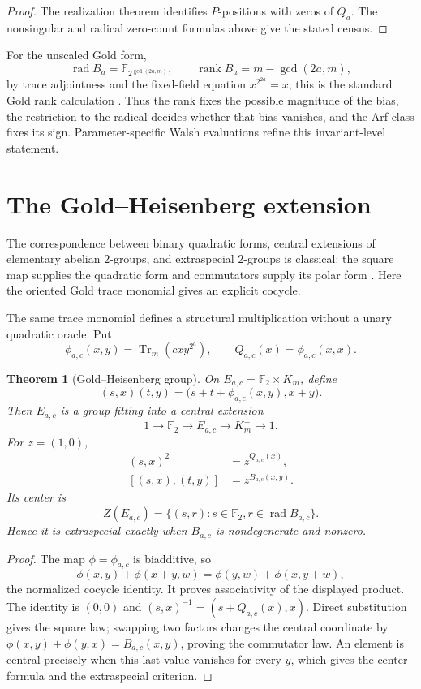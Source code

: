 \documentclass[11pt]{article}
\newtheorem{theorem}{Theorem}[section]
\theoremstyle{definition}
\theoremstyle{remark}
\newcommand{\F}{\mathbb{F}}
\newcommand{\Tr}{\operatorname{Tr}}
\newcommand{\rad}{\operatorname{rad}}
\newcommand{\rank}{\operatorname{rank}}
\begin{document}
\begin{proof}
The realization theorem identifies $P$-positions with zeros of $Q_a$.
The nonsingular and radical zero-count formulas above give the stated
census.
\end{proof}

For the unscaled Gold form,
\[
 \rad B_a=\F_{2^{\gcd(2a,m)}},
 \qquad \rank B_a=m-\gcd(2a,m),
\]
by trace adjointness and the fixed-field equation
$x^{2^{2a}}=x$; this is the standard Gold rank calculation
\cite{coulter1999,hellesethkumar1998}.  Thus the rank fixes the possible
magnitude of the bias, the restriction to the radical decides whether that
bias vanishes, and the Arf class fixes its sign.  Parameter-specific Walsh
evaluations refine this invariant-level statement.

\section{The Gold--Heisenberg extension}\label{sec:heisenberg}

The correspondence between binary quadratic forms, central extensions of
elementary abelian $2$-groups, and extraspecial $2$-groups is classical: the
square map supplies the quadratic form and commutators supply its polar form
\cite[Sections~4--5]{quillen1971}.  Here the oriented Gold trace monomial
gives an explicit cocycle.

The same trace monomial defines a structural multiplication without a unary
quadratic oracle.  Put
\[
 \phi_{a,c}(x,y)=\Tr_m(cxy^{2^a}),
 \qquad Q_{a,c}(x)=\phi_{a,c}(x,x).
\]

\begin{theorem}[Gold--Heisenberg group]\label{thm:heisenberg}
On $E_{a,c}=\F_2\times K_m$, define
\[
 (s,x)(t,y)=\bigl(s+t+\phi_{a,c}(x,y),x+y\bigr).
\]
Then $E_{a,c}$ is a group fitting into a central extension
\[
 1\longrightarrow\F_2\longrightarrow E_{a,c}
 \longrightarrow K_m^+\longrightarrow1.
\]
For $z=(1,0)$,
\begin{align*}
 (s,x)^2&=z^{Q_{a,c}(x)},\\
 [(s,x),(t,y)]&=z^{B_{a,c}(x,y)}.
\end{align*}
Its center is
\[
 Z(E_{a,c})=\{(s,r):s\in\F_2, r\in\rad B_{a,c}\}.
\]
Hence it is extraspecial exactly when $B_{a,c}$ is nondegenerate and
nonzero.
\end{theorem}

\begin{proof}
The map $\phi=\phi_{a,c}$ is biadditive, so
\[
 \phi(x,y)+\phi(x+y,w)=\phi(y,w)+\phi(x,y+w),
\]
the normalized cocycle identity.  It proves associativity of the displayed
product.  The identity is $(0,0)$ and
$(s,x)^{-1}=(s+Q_{a,c}(x),x)$.  Direct substitution gives
the square law; swapping two factors changes the central coordinate by
$\phi(x,y)+\phi(y,x)=B_{a,c}(x,y)$, proving
the commutator law.  An element is central precisely when this last value
vanishes for every $y$, which gives the center formula and the extraspecial
criterion.
\end{proof}
\end{document}
